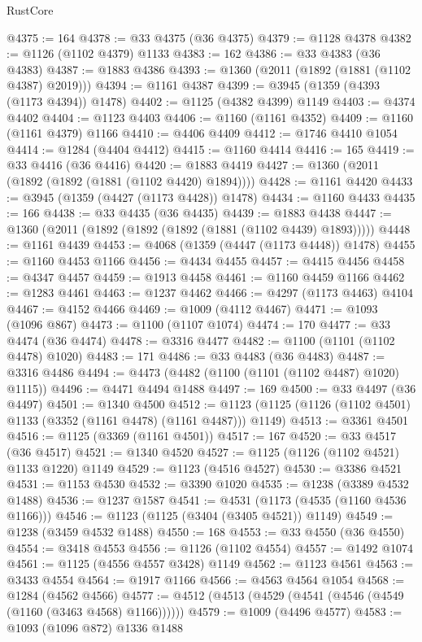 \begin{lexlean}{RustCore}
\begin{coremodule}
@4375 := 164
@4378 := @33 @4375 (@36 @4375)
@4379 := @1128 @4378
@4382 := @1126 (@1102 @4379) @1133
@4383 := 162
@4386 := @33 @4383 (@36 @4383)
@4387 := @1883 @4386
@4393 := @1360 (@2011 (@1892 (@1881 (@1102 @4387) @2019)))
@4394 := @1161 @4387
@4399 := @3945 (@1359 (@4393 (@1173 @4394)) @1478)
@4402 := @1125 (@4382 @4399) @1149
@4403 := @4374 @4402
@4404 := @1123 @4403
@4406 := @1160 (@1161 @4352)
@4409 := @1160 (@1161 @4379) @1166
@4410 := @4406 @4409
@4412 := @1746 @4410 @1054
@4414 := @1284 (@4404 @4412)
@4415 := @1160 @4414
@4416 := 165
@4419 := @33 @4416 (@36 @4416)
@4420 := @1883 @4419
@4427 := @1360 (@2011 (@1892 (@1892 (@1881 (@1102 @4420) @1894))))
@4428 := @1161 @4420
@4433 := @3945 (@1359 (@4427 (@1173 @4428)) @1478)
@4434 := @1160 @4433
@4435 := 166
@4438 := @33 @4435 (@36 @4435)
@4439 := @1883 @4438
@4447 := @1360 (@2011 (@1892 (@1892 (@1892 (@1881 (@1102 @4439) @1893)))))
@4448 := @1161 @4439
@4453 := @4068 (@1359 (@4447 (@1173 @4448)) @1478)
@4455 := @1160 @4453 @1166
@4456 := @4434 @4455
@4457 := @4415 @4456
@4458 := @4347 @4457
@4459 := @1913 @4458
@4461 := @1160 @4459 @1166
@4462 := @1283 @4461
@4463 := @1237 @4462
@4466 := @4297 (@1173 @4463) @4104
@4467 := @4152 @4466
@4469 := @1009 (@4112 @4467)
@4471 := @1093 (@1096 @867)
@4473 := @1100 (@1107 @1074)
@4474 := 170
@4477 := @33 @4474 (@36 @4474)
@4478 := @3316 @4477
@4482 := @1100 (@1101 (@1102 @4478) @1020)
@4483 := 171
@4486 := @33 @4483 (@36 @4483)
@4487 := @3316 @4486
@4494 := @4473 (@4482 (@1100 (@1101 (@1102 @4487) @1020) @1115))
@4496 := @4471 @4494 @1488
@4497 := 169
@4500 := @33 @4497 (@36 @4497)
@4501 := @1340 @4500
@4512 := @1123 (@1125 (@1126 (@1102 @4501) @1133 (@3352 (@1161 @4478) (@1161 @4487))) @1149)
@4513 := @3361 @4501
@4516 := @1125 (@3369 (@1161 @4501))
@4517 := 167
@4520 := @33 @4517 (@36 @4517)
@4521 := @1340 @4520
@4527 := @1125 (@1126 (@1102 @4521) @1133 @1220) @1149
@4529 := @1123 (@4516 @4527)
@4530 := @3386 @4521
@4531 := @1153 @4530
@4532 := @3390 @1020
@4535 := @1238 (@3389 @4532 @1488)
@4536 := @1237 @1587
@4541 := @4531 (@1173 (@4535 (@1160 @4536 @1166)))
@4546 := @1123 (@1125 (@3404 (@3405 @4521)) @1149)
@4549 := @1238 (@3459 @4532 @1488)
@4550 := 168
@4553 := @33 @4550 (@36 @4550)
@4554 := @3418 @4553
@4556 := @1126 (@1102 @4554)
@4557 := @1492 @1074
@4561 := @1125 (@4556 @4557 @3428) @1149
@4562 := @1123 @4561
@4563 := @3433 @4554
@4564 := @1917 @1166
@4566 := @4563 @4564 @1054
@4568 := @1284 (@4562 @4566)
@4577 := @4512 (@4513 (@4529 (@4541 (@4546 (@4549 (@1160 (@3463 @4568) @1166))))))
@4579 := @1009 (@4496 @4577)
@4583 := @1093 (@1096 @872) @1336 @1488

\end{coremodule}
\end{lexlean}
